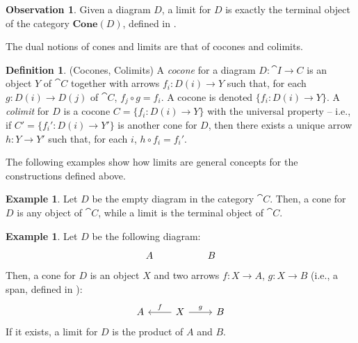 \documentclass[a4paper, twoside,openright]{report}
\theoremstyle{plain}
\theoremstyle{definition}
\newtheorem{definition}[theorem]{Definition}
\newtheorem{example}[theorem]{Example}
\newtheorem{obs}[theorem]{Observation}
\begin{document}
\begin{obs}
    Given a diagram $D$, a limit for $D$ is exactly the terminal object of the category $\textbf{Cone}(D)$, defined in .
\end{obs}

The dual notions of cones and limits are that of cocones and colimits.

\begin{definition}(Cocones, Colimits)
    A \emph{cocone} for a diagram $D: \cat{I \rightarrow C}$ is an object $Y$ of $\cat C$ together with arrows $f_i : D(i) \rightarrow Y$ such that, for each $g: D(i) \rightarrow D(j)$ of $\cat C$, $f_j \circ g = f_i$. A cocone is denoted $\{f_i: D(i) \rightarrow Y \}$.
    A \emph{colimit} for $D$ is a cocone $C = \{f_i: D(i) \rightarrow Y \}$ with the universal property -- i.e., if $C' = \{ f_i' : D(i) \rightarrow Y'\}$ is another cone for $D$, then there exists a unique arrow $h:Y \rightarrow Y'$ such that, for each $i$, $h \circ f_i = f_i'$.
\end{definition}

The following examples show how limits are general concepts for the constructions defined above.

\begin{example}
    Let $D$ be the empty diagram in the category $\cat C$. Then, a cone for $D$ is any object of $\cat C$, while a limit is the terminal object of $\cat C$.
\end{example}

\begin{example}\label{ex:product_are_limits}
    Let $D$ be the following diagram:
    \[
        \begin{tikzcd}
            A & & B
        \end{tikzcd}
    \]
    Then, a cone for $D$ is an object $X$ and two arrows $f: X \rightarrow A$, $g: X \rightarrow B$ (i.e., a span, defined in ):
    \[
        \begin{tikzcd}
            A & X \arrow[l, "f" swap] \arrow[r, "g"] & B
        \end{tikzcd}
    \]
    If it exists, a limit for $D$ is the product of $A$ and $B$.
\end{example}
\end{document}
